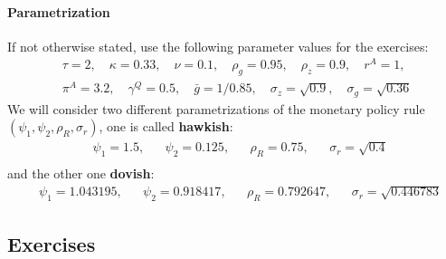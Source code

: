 \paragraph{Parametrization}
If not otherwise stated, use the following parameter values for the exercises:
\begin{align*}
&\tau=2,\quad
\kappa=0.33,\quad
\nu=0.1,\quad
\rho_g=0.95,\quad
\rho_z=0.9,\quad	
r^{A}=1,\quad
\\
&\pi^{A}=3.2,\quad
\gamma^{Q}=0.5,\quad
\bar{g}=1/0.85,\quad
\sigma_z = \sqrt{0.9},\quad
\sigma_g=\sqrt{0.36}
  \end{align*}
We will consider two different parametrizations of the monetary policy rule $(\psi_1,\psi_2,\rho_R,\sigma_r)$, one is called \textbf{hawkish}:
\begin{align*}
&\psi_1=1.5,&& \psi_2=0.125,&& \rho_R = 0.75,&& \sigma_r = \sqrt{0.4}	\\
\end{align*}
and the other one \textbf{dovish}:
\begin{align*}
&\psi_1=1.043195,&& \psi_2=0.918417,&& \rho_R = 0.792647,&& \sigma_r = \sqrt{0.446783}	
\end{align*}

\newpage

\subsection*{Exercises}

